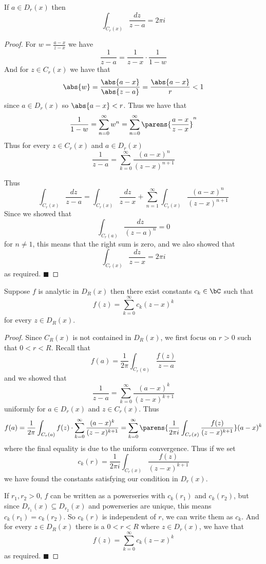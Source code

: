\documentclass[10pt]{article}
\def\qed{\hskip1cm\hbox{}\hfill$\blacksquare$}
\begin{document}
\begin{lemm*}

    If $a\in D_r(x)$ then
    \[ \int_{C_r(x)}\frac{dz}{z-a} = 2\pi i \]

\end{lemm*}

\begin{proof}

    For $w=\frac{a-x}{z-x}$ we have
    \[ \frac1{z-a} = \frac1{z-x}\cdot\frac1{1-w} \]
    And for $z\in C_r(x)$ we have that
    \[ \abs{w} = \frac{\abs{a-x}}{\abs{z-a}} = \frac{\abs{a-x}}r < 1 \]
    since $a\in D_r(x)$ so $\abs{a-x}<r$.
    Thus we have that
    \[ \frac1{1-w} = \sum_{n=0}^\infty w^n = \sum_{n=0}^\infty\parens{\frac{a-x}{z-x}}^n \]
    Thus for every $z\in C_r(x)$ and $a\in D_r(x)$
    \[ \frac1{z-a} = \sum_{k=0}^\infty\frac{(a-x)^n}{(z-x)^{n+1}} \]

    Thus
    \[ \int_{C_r(x)}\frac{dz}{z-a} = \int_{C_r(x)}\frac{dz}{z-x} + \sum_{n=1}^\infty\int_{C_r(x)}\frac{(a-x)^n}{(z-x)^{n+1}} \]
    Since we showed that
    \[ \int_{C_r(a)}\frac{dz}{(z-a)^n} = 0 \]
    for $n\neq1$, this means that the right sum is zero, and we also showed that
    \[ \int_{C_r(x)}\frac{dz}{z-x} = 2\pi i \]
    as required.
    \qed

\end{proof}

\begin{thrm*}

    Suppose $f$ is analytic in $D_R(x)$ then there exist constants $c_k\in\bC$ such that
    \[ f(z) = \sum_{k=0}^\infty c_k(z-x)^k \]
    for every $z\in D_R(x)$.

\end{thrm*}

\begin{proof}

    Since $C_R(x)$ is not contained in $D_R(x)$, we first focus on $r>0$ such that $0<r<R$.
    Recall that
    \[ f(a) = \frac1{2\pi}\int_{C_r(a)}\frac{f(z)}{z-a} \]
    and we showed that
    \[ \frac1{z-a} = \sum_{k=0}^\infty\frac{(a-x)^k}{(z-x)^{k+1}} \]
    uniformly for $a\in D_r(x)$ and $z\in C_r(x)$.
    Thus
    \[ f(a) = \frac1{2\pi}\int_{C_r(a)}f(z)\cdot\sum_{k=0}^\infty\frac{(a-x)^k}{(z-x)^{k+1}} = \sum_{k=0}^\infty\parens{\frac1{2\pi i}\int_{C_r(x)}\frac{f(z)}{(z-x)^{k+1}}}(a-x)^k \]
    where the final equality is due to the uniform convergence.
    Thus if we set
    \[ c_k(r) = \frac1{2\pi i}\int_{C_r(x)}\frac{f(z)}{(z-x)^{k+1}} \]
    we have found the constants satisfying our condition in $D_r(x)$.

    If $r_1,r_2>0$, $f$ can be written as a powerseries with $c_k(r_1)$ and $c_k(r_2)$, but since $D_{r_1}(x)\subseteq D_{r_2}(x)$ and powerseries are unique, this means $c_k(r_1)=c_k(r_2)$.
    So $c_k(r)$ is independent of $r$, we can write them as $c_k$.
    And for every $z\in D_R(x)$ there is a $0<r<R$ where $z\in D_r(x)$, we have that
    \[ f(z) = \sum_{k=0}^\infty c_k(z-x)^k \]
    as required.
    \qed

\end{proof}
\end{document}
